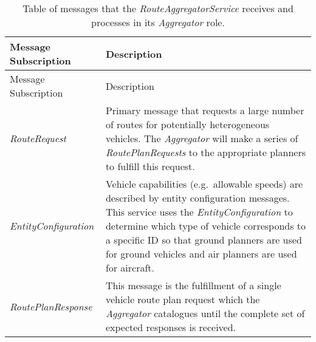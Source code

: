 \begin{longtable}[c]{@{}ll@{}}
\caption{Table of messages that the \emph{RouteAggregatorService}
receives and processes in its \emph{Aggregator} role.}\tabularnewline
\toprule
\begin{minipage}[b]{0.29\columnwidth}\raggedright\strut
Message Subscription
\strut\end{minipage} &
\begin{minipage}[b]{0.65\columnwidth}\raggedright\strut
Description
\strut\end{minipage}\tabularnewline
\midrule
\endfirsthead
\toprule
\begin{minipage}[b]{0.29\columnwidth}\raggedright\strut
Message Subscription
\strut\end{minipage} &
\begin{minipage}[b]{0.65\columnwidth}\raggedright\strut
Description
\strut\end{minipage}\tabularnewline
\midrule
\endhead
\begin{minipage}[t]{0.29\columnwidth}\raggedright\strut
\emph{RouteRequest}
\strut\end{minipage} &
\begin{minipage}[t]{0.65\columnwidth}\raggedright\strut
Primary message that requests a large number of routes for potentially
heterogeneous vehicles. The \emph{Aggregator} will make a series of
\emph{RoutePlanRequests} to the appropriate planners to fulfill this
request.
\strut\end{minipage}\tabularnewline
\begin{minipage}[t]{0.29\columnwidth}\raggedright\strut
\emph{EntityConfiguration}
\strut\end{minipage} &
\begin{minipage}[t]{0.65\columnwidth}\raggedright\strut
Vehicle capabilities (e.g.~allowable speeds) are described by entity
configuration messages. This service uses the \emph{EntityConfiguration}
to determine which type of vehicle corresponds to a specific ID so that
ground planners are used for ground vehicles and air planners are used
for aircraft.
\strut\end{minipage}\tabularnewline
\begin{minipage}[t]{0.29\columnwidth}\raggedright\strut
\emph{RoutePlanResponse}
\strut\end{minipage} &
\begin{minipage}[t]{0.65\columnwidth}\raggedright\strut
This message is the fulfillment of a single vehicle route plan request
which the \emph{Aggregator} catalogues until the complete set of
expected responses is received.
\strut\end{minipage}\tabularnewline
\bottomrule
\end{longtable}

